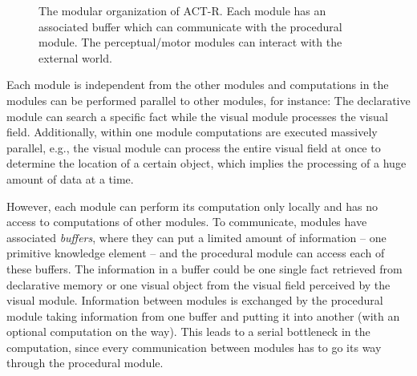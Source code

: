 \begin{figure}[hbt]
\begin{center}
\caption{The modular organization of ACT-R. Each module has an associated buffer which can communicate with the procedural module. The perceptual/motor modules can interact with the external world. \cite[fig. 1]{anderson_integrated_2004}}
\label{fig:modular_organization}
\end{center}
\end{figure}


Each module is independent from the other modules and computations in the modules can be performed parallel to other modules, for instance: The declarative module can search a specific fact while the visual module processes the visual field. Additionally, within one module computations are executed massively parallel, e.g., the visual module can process the entire visual field at once to determine the location of a certain object, which implies the processing of a huge amount of data at a time.

However, each module can perform its computation only locally and has no access to computations of other modules. To communicate, modules have associated \emph{buffers}, where they can put a limited amount of information -- one primitive knowledge element -- and the procedural module can access each of these buffers. The information in a buffer could be one single fact retrieved from declarative memory or one visual object from the visual field perceived by the visual module. Information between modules is exchanged by the procedural module taking information from one buffer and putting it into another (with an optional computation on the way). This leads to a serial bottleneck in the computation, since every communication between modules has to go its way through the procedural module.

